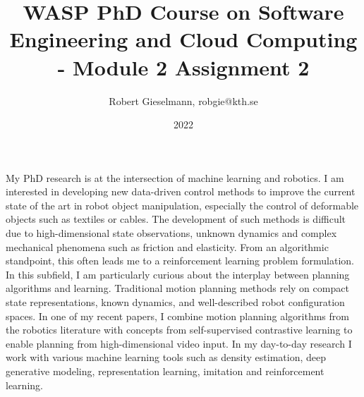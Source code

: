 \documentclass[11pt]{article}
\title{WASP PhD Course on Software Engineering and Cloud Computing - Module 2 Assignment 2}
\author{Robert Gieselmann, robgie@kth.se}
\date{2022}
\begin{document}
\maketitle

\noindent  My PhD research is at the intersection of machine learning and robotics. I am interested in developing new data-driven control methods to improve the current state of the art in robot object manipulation, especially the control of deformable objects such as textiles or cables. The development of such methods is difficult due to high-dimensional state observations, unknown dynamics and complex mechanical phenomena such as friction and elasticity. From an algorithmic standpoint, this often leads me to a reinforcement learning problem formulation. In this subfield, I am particularly curious about the interplay between planning algorithms and learning. Traditional motion planning methods rely on compact state representations, known dynamics, and well-described robot configuration spaces. In one of my recent papers, I combine motion planning algorithms from the robotics literature with concepts from self-supervised contrastive learning to enable planning from high-dimensional video input. In my day-to-day research I work with various machine learning tools such as density estimation, deep generative modeling, representation learning, imitation and reinforcement learning.
\end{document}
